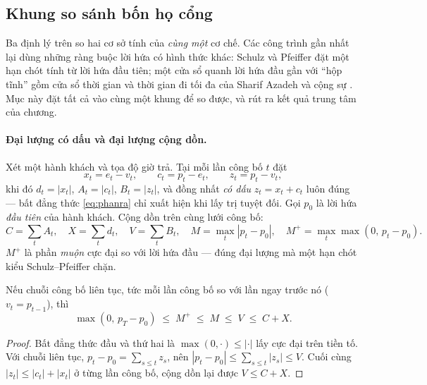 \subsection{Khung so sánh bốn họ cổng}
\label{muc:hocong}

Ba định lý trên so hai cơ sở tính của \emph{cùng một} cơ chế. Các công trình gần nhất lại dùng
những ràng buộc lời hứa có hình thức khác: Schulz và Pfeiffer \cite{schulz2026} đặt một hạn chót
tính từ lời hứa đầu tiên; một cửa sổ quanh lời hứa đầu gần với ``hộp tĩnh'' gồm cửa sổ thời gian
và thời gian đi tối đa của Sharif Azadeh và cộng sự \cite{sharifazadeh2022}. Mục này đặt tất cả
vào cùng một khung để so được, và rút ra kết quả trung tâm của chương.

\paragraph{Đại lượng có dấu và đại lượng cộng dồn.} Xét một hành khách và tọa độ giờ trả. Tại mỗi
lần công bố $t$ đặt
\begin{equation}
x_t = e_t - v_t, \qquad c_t = p_t - e_t, \qquad z_t = p_t - v_t,
\end{equation}
khi đó $d_t = |x_t|$, $A_t = |c_t|$, $B_t = |z_t|$, và đồng nhất \emph{có dấu} $z_t = x_t + c_t$
luôn đúng --- bất đẳng thức \eqref{eq:phanra} chỉ xuất hiện khi lấy trị tuyệt đối. Gọi $p_0$ là
lời hứa \emph{đầu tiên} của hành khách. Cộng dồn trên cùng lưới công bố:
\begin{equation}
C = \sum_t A_t, \quad X = \sum_t d_t, \quad V = \sum_t B_t, \quad
M = \max_t |p_t - p_0|, \quad M^{+} = \max_t \max(0,\, p_t - p_0).
\end{equation}
$M^{+}$ là phần \emph{muộn} cực đại so với lời hứa đầu --- đúng đại lượng mà một hạn chót kiểu
Schulz--Pfeiffer chặn.

\begin{menhde}
\label{md:chuoi}
Nếu chuỗi công bố liên tục, tức mỗi lần công bố so với lần ngay trước nó ($v_t = p_{t-1}$), thì
\[
\max(0,\, p_T - p_0) \;\le\; M^{+} \;\le\; M \;\le\; V \;\le\; C + X .
\]
\end{menhde}

\begin{proof}
Bất đẳng thức đầu và thứ hai là $\max(0,\cdot) \le |\cdot|$ lấy cực đại trên tiền tố. Với chuỗi
liên tục, $p_t - p_0 = \sum_{s \le t} z_s$, nên $|p_t - p_0| \le \sum_{s \le t} |z_s| \le V$.
Cuối cùng $|z_t| \le |c_t| + |x_t|$ ở từng lần công bố, cộng dồn lại được $V \le C + X$.
\end{proof}

